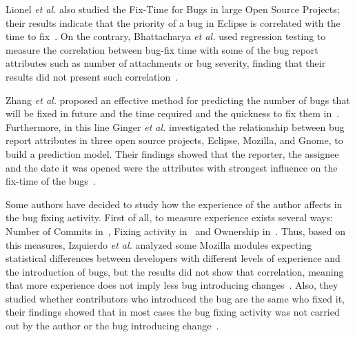 \documentclass[10pt, conference]{IEEEtran}
\begin{document}
Lionel \emph{et al.} also studied the Fix-Time for Bugs in large Open Source Projects; their results indicate that the priority of a bug in Eclipse is correlated with the time to fix~\cite{marks2011studying}. On the contrary, Bhattacharya \emph{et al.} used regression testing to measure the correlation between bug-fix time with some of the bug report attributes such as number of attachments or bug severity, finding that their results did not present such correlation~\cite{bhattacharya2011bug}.



Zhang \emph{et al.} proposed an effective method for predicting the number of bugs that will be fixed in future and the time required and the quickness to fix them in~\cite{zhang2013predicting}. Furthermore, in this line Ginger \emph{et al.} investigated the relationship between bug report attributes in three open source projects, Eclipse, Mozilla, and Gnome, to build a prediction model. Their findings showed that the reporter, the assignee and the date it was opened were the attributes with strongest influence on the fix-time of the bugs~\cite{giger2010predicting}.


Some authors have decided to study how the experience of the author affects in the bug fixing activity. First of all, to measure experience exists several ways: Number of Commits in~\cite{eyolfson2011time}, Fixing activity in~\cite{ahsan2010mining} and Ownership in~\cite{german2004using}. Thus, based on this measures, Izquierdo \emph{et al.} analyzed some Mozilla modules expecting statistical differences between developers with different levels of experience and the introduction of bugs, but the results did not show that correlation, meaning that more experience does not imply less bug introducing changes~\cite{izquierdo2012more}. Also, they studied whether contributors who introduced the bug are the same who fixed it, their findings showed that in most cases the bug fixing activity was not carried out by the author or the bug introducing change~\cite{izquierdo2011developers}. 
\end{document}
